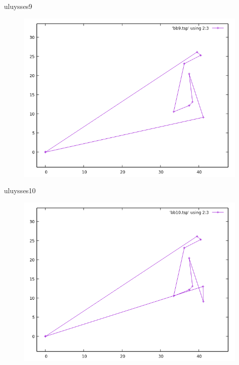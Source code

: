 \documentclass{beamer}
\begin{document}
\begin{frame}[fragile]{uluysses9}
\begin{figure}[H]
\centering
\includegraphics[scale=0.5]{bb9.png}
\end{figure}
\end{frame}

\begin{frame}[fragile]{uluysses10}
\begin{figure}[H]
\centering
\includegraphics[scale=0.5]{bb10.png}
\end{figure}
\end{frame}
\end{document}
